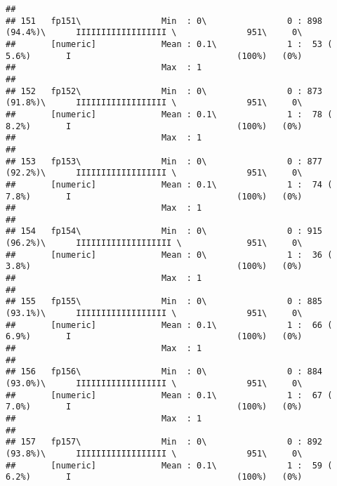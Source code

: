 \documentclass[]{article}
\begin{document}
\begin{verbatim}
## 
## 151   fp151\                Min  : 0\                0 : 898 (94.4%)\      IIIIIIIIIIIIIIIIII \              951\     0\       
##       [numeric]             Mean : 0.1\              1 :  53 ( 5.6%)       I                                 (100%)   (0%)     
##                             Max  : 1                                                                                           
## 
## 152   fp152\                Min  : 0\                0 : 873 (91.8%)\      IIIIIIIIIIIIIIIIII \              951\     0\       
##       [numeric]             Mean : 0.1\              1 :  78 ( 8.2%)       I                                 (100%)   (0%)     
##                             Max  : 1                                                                                           
## 
## 153   fp153\                Min  : 0\                0 : 877 (92.2%)\      IIIIIIIIIIIIIIIIII \              951\     0\       
##       [numeric]             Mean : 0.1\              1 :  74 ( 7.8%)       I                                 (100%)   (0%)     
##                             Max  : 1                                                                                           
## 
## 154   fp154\                Min  : 0\                0 : 915 (96.2%)\      IIIIIIIIIIIIIIIIIII \             951\     0\       
##       [numeric]             Mean : 0\                1 :  36 ( 3.8%)                                         (100%)   (0%)     
##                             Max  : 1                                                                                           
## 
## 155   fp155\                Min  : 0\                0 : 885 (93.1%)\      IIIIIIIIIIIIIIIIII \              951\     0\       
##       [numeric]             Mean : 0.1\              1 :  66 ( 6.9%)       I                                 (100%)   (0%)     
##                             Max  : 1                                                                                           
## 
## 156   fp156\                Min  : 0\                0 : 884 (93.0%)\      IIIIIIIIIIIIIIIIII \              951\     0\       
##       [numeric]             Mean : 0.1\              1 :  67 ( 7.0%)       I                                 (100%)   (0%)     
##                             Max  : 1                                                                                           
## 
## 157   fp157\                Min  : 0\                0 : 892 (93.8%)\      IIIIIIIIIIIIIIIIII \              951\     0\       
##       [numeric]             Mean : 0.1\              1 :  59 ( 6.2%)       I                                 (100%)   (0%)     

\end{verbatim}
\end{document}
